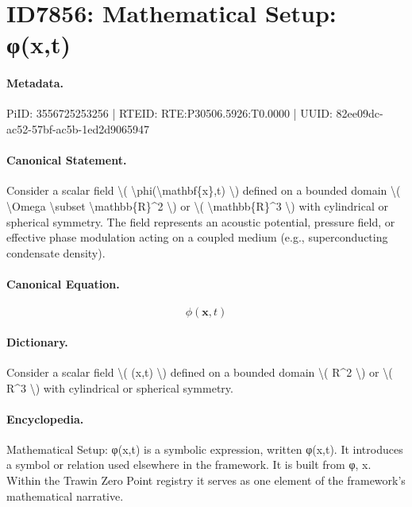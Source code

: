 \section*{ID7856: Mathematical Setup: φ(x,t)}
\paragraph{Metadata.}
PiID: 3556725253256 | RTEID: RTE:P30506.5926:T0.0000 | UUID: 82ee09dc-ac52-57bf-ac5b-1ed2d9065947

\paragraph{Canonical Statement.}
Consider a scalar field \textbackslash{}( \textbackslash{}phi(\textbackslash{}mathbf\{x\},t) \textbackslash{}) defined on a bounded domain \textbackslash{}( \textbackslash{}Omega \textbackslash{}subset \textbackslash{}mathbb\{R\}\textasciicircum{}2 \textbackslash{}) or \textbackslash{}( \textbackslash{}mathbb\{R\}\textasciicircum{}3 \textbackslash{}) with cylindrical or spherical symmetry. The field represents an acoustic potential, pressure field, or effective phase modulation acting on a coupled medium (e.g., superconducting condensate density).

\paragraph{Canonical Equation.}
\[
\phi(\mathbf{x},t)
\]

\paragraph{Dictionary.}
Consider a scalar field \textbackslash{}( (x,t) \textbackslash{}) defined on a bounded domain \textbackslash{}( R\textasciicircum{}2 \textbackslash{}) or \textbackslash{}( R\textasciicircum{}3 \textbackslash{}) with cylindrical or spherical symmetry.

\paragraph{Encyclopedia.}
Mathematical Setup: φ(x,t) is a symbolic expression, written φ(x,t). It introduces a symbol or relation used elsewhere in the framework. It is built from φ, x. Within the Trawin Zero Point registry it serves as one element of the framework's mathematical narrative.
